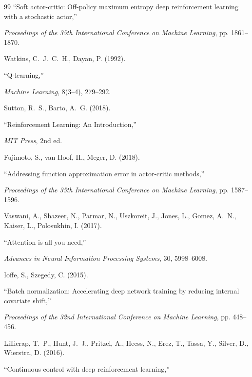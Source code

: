 \documentclass[fleqn,10pt]{wlscirep}
\begin{document}
\begin{thebibliography}{99}
``Soft actor-critic: Off-policy maximum entropy deep reinforcement learning with a stochastic actor,''

\textit{Proceedings of the 35th International Conference on Machine Learning}, pp. 1861--1870.




Watkins, C.~J.~C.~H., Dayan, P. (1992).

``Q-learning,''

\textit{Machine Learning}, 8(3--4), 279--292.




Sutton, R.~S., Barto, A.~G. (2018).

``Reinforcement Learning: An Introduction,''

\textit{MIT Press}, 2nd ed.




Fujimoto, S., van Hoof, H., Meger, D. (2018).

``Addressing function approximation error in actor-critic methods,''

\textit{Proceedings of the 35th International Conference on Machine Learning}, pp. 1587--1596.




Vaswani, A., Shazeer, N., Parmar, N., Uszkoreit, J., Jones, L., Gomez, A.~N., Kaiser, L., Polosukhin, I. (2017).

``Attention is all you need,''

\textit{Advances in Neural Information Processing Systems}, 30, 5998--6008.




Ioffe, S., Szegedy, C. (2015).

``Batch normalization: Accelerating deep network training by reducing internal covariate shift,''

\textit{Proceedings of the 32nd International Conference on Machine Learning}, pp. 448--456.


Lillicrap, T.~P., Hunt, J.~J., Pritzel, A., Heess, N., Erez, T., Tassa, Y., Silver, D., Wierstra, D. (2016).

``Continuous control with deep reinforcement learning,''


\end{thebibliography}
\end{document}
